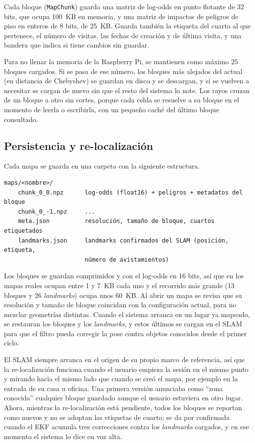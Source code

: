 Cada bloque (\texttt{MapChunk}) guarda una matriz de log-odds en punto flotante de
32 bits, que ocupa 100~KB en memoria, y una matriz de impactos de peligros de piso en
enteros de 8 bits, de 25~KB. Guarda también la etiqueta del cuarto al que pertenece, el
número de visitas, las fechas de creación y de última visita, y una bandera que indica
si tiene cambios sin guardar.

Para no llenar la memoria de la Raspberry Pi, se mantienen como máximo 25 bloques
cargados. Si se pasa de ese número, los bloques más alejados del actual (en distancia de
Chebyshev) se guardan en disco y se descargan, y si se vuelven a necesitar se cargan de
nuevo sin que el resto del sistema lo note. Los rayos cruzan de un bloque a otro sin
cortes, porque cada celda se resuelve a su bloque en el momento de leerla o escribirla,
con un pequeño caché del último bloque consultado.

\subsection{Persistencia y re-localización}

Cada mapa se guarda en una carpeta con la siguiente estructura.

\begin{verbatim}
maps/<nombre>/
    chunk_0_0.npz      log-odds (float16) + peligros + metadatos del bloque
    chunk_0_-1.npz     ...
    meta.json          resolución, tamaño de bloque, cuartos etiquetados
    landmarks.json     landmarks confirmados del SLAM (posición, etiqueta,
                       número de avistamientos)
\end{verbatim}

Los bloques se guardan comprimidos y con el log-odds en 16 bits, así que en los mapas
reales ocupan entre 1 y 7~KB cada uno y el recorrido más grande (13 bloques y
26 \emph{landmarks}) ocupa unos 60~KB. Al abrir un mapa se revisa que su resolución y
tamaño de bloque coincidan con la configuración actual, para no mezclar geometrías
distintas. Cuando el sistema arranca en un lugar ya mapeado, se restauran los bloques y
los \emph{landmarks}, y estos últimos se cargan en el SLAM para que el filtro pueda
corregir la pose contra objetos conocidos desde el primer ciclo.

El SLAM siempre arranca en el origen de su propio marco de referencia, así que la
re-localización funciona cuando el usuario empieza la sesión en el mismo punto y mirando
hacia el mismo lado que cuando se creó el mapa, por ejemplo en la entrada de su casa u
oficina. Una primera versión anunciaba como ``zona conocida'' cualquier bloque guardado
aunque el usuario estuviera en otro lugar. Ahora, mientras la re-localización está
pendiente, todos los bloques se reportan como nuevos y no se adoptan las etiquetas de
cuarto; se da por confirmada cuando el EKF acumula tres correcciones contra los
\emph{landmarks} cargados, y en ese momento el sistema lo dice en voz alta.

